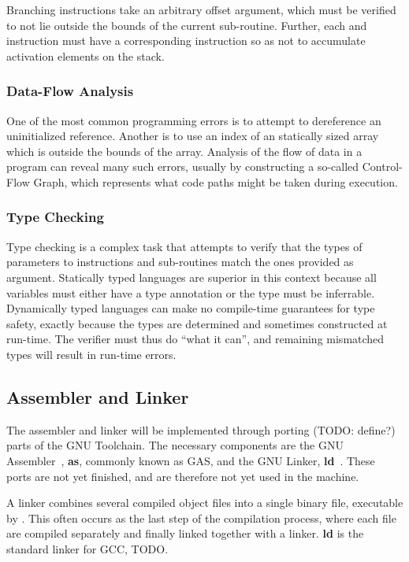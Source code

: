 Branching instructions take an arbitrary offset argument, which must be verified
to not lie outside the bounds of the current sub-routine. Further, each
 and  instruction must have a corresponding
 instruction so as not to accumulate activation elements on the
stack.

\subsubsection{Data-Flow Analysis}

One of the most common programming errors is to attempt to dereference an
uninitialized reference. Another is to use an index of an statically sized array
which is outside the bounds of the array. Analysis of the flow of data in a
program can reveal many such errors, usually by constructing a so-called
Control-Flow Graph, which represents what code paths might be taken during
execution.

\subsubsection{Type Checking}

Type checking is a complex task that attempts to verify that the types of
parameters to instructions and sub-routines match the ones provided as
argument. Statically typed languages are superior in this context because all
variables must either have a type annotation or the type must be
inferrable. Dynamically typed languages can make no compile-time guarantees for
type safety, exactly because the types are determined and sometimes constructed
at run-time. The verifier must thus do ``what it can'', and remaining mismatched
types will result in run-time errors.


\subsection{Assembler and Linker}

The assembler and linker will be implemented through porting (TODO: define?)
parts of the GNU Toolchain. The necessary components are the GNU
Assembler~\cite{gnu:as}, {\bf as}, commonly known as GAS, and the GNU Linker,
{\bf ld}~\cite{gnu:ld}. These ports are not yet finished, and are therefore not
yet used in the machine.

A linker combines several compiled object files into a single binary file,
executable by \thename{}. This often occurs as the last step of the compilation
process, where each file are compiled separately and finally linked together
with a linker. {\bf ld} is the standard linker for GCC, TODO.

